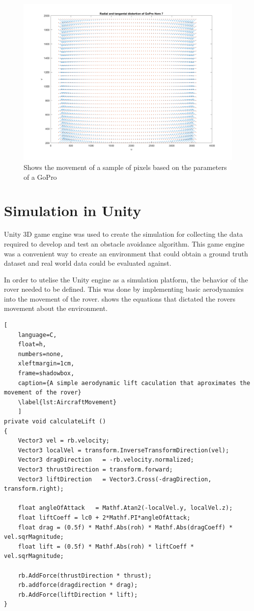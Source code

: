 \documentclass{UoNMCHA}
\numberwithin{equation}{section}
\begin{document}
\begin{figure}[ht]
    \begin{center}
        \includegraphics[width=.9\linewidth]{Figures/Matlab/DistortionMovement}
        \caption{Shows the movement of a sample of pixels based on the parameters of a GoPro}
        \label{fig:DistortionMovement}
    \end{center}
\end{figure}

\newpage
\section{Simulation in Unity}
Unity 3D game engine was used to create the simulation for collecting the data required to develop and test an obstacle avoidance algorithm. This game engine was a convenient way to create an environment that could obtain a ground truth dataset and real world data could be evaluated against.

In order to utelise the Unity engine as a simulation platform, the behavior of the rover needed to be defined. This was done by implementing basic aerodynamics into the movement of the rover.  shows the equations that dictated the rovers movement about the environment.

\begin{lstlisting}[
    language=C,
	float=h,
	numbers=none,
    xleftmargin=1cm,
    frame=shadowbox,
	caption={A simple aerodynamic lift caculation that aproximates the movement of the rover}
	\label{lst:AircraftMovement}
	]
private void calculateLift ()
{
	Vector3 vel = rb.velocity;
	Vector3 localVel = transform.InverseTransformDirection(vel);
	Vector3 dragDirection   = -rb.velocity.normalized;
	Vector3 thrustDirection = transform.forward;
	Vector3 liftDirection   = Vector3.Cross(-dragDirection, transform.right);

	float angleOfAttack   = Mathf.Atan2(-localVel.y, localVel.z);
	float liftCoeff = lc0 + 2*Mathf.PI*angleOfAttack;
	float drag = (0.5f) * Mathf.Abs(roh) * Mathf.Abs(dragCoeff) * vel.sqrMagnitude;
	float lift = (0.5f) * Mathf.Abs(roh) * liftCoeff * vel.sqrMagnitude;

	rb.AddForce(thrustDirection * thrust);
	rb.addforce(dragdirection * drag);
	rb.AddForce(liftDirection * lift);
}
\end{lstlisting}
\end{document}
